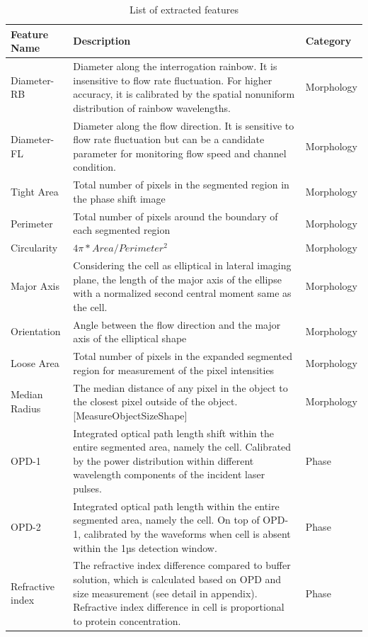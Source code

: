 \documentclass[aps,pra,preprint,superscriptaddress]{revtex4-1}
\begin{document}
\begin{table}[H]
\caption{\label{tbl:Features} List of extracted features}
\begin{tabular}{|p{}|p{}|p{}|}
\hline
Feature Name	 &Description	 &Category\\ \hline
Diameter-RB	 &Diameter along the interrogation rainbow. It is insensitive to flow rate fluctuation. For higher accuracy, it is calibrated by the spatial nonuniform distribution of rainbow wavelengths. 	 &Morphology\\ \hline
Diameter-FL	 &Diameter along the flow direction. It is sensitive to flow rate fluctuation but can be a candidate parameter for monitoring flow speed and channel condition.	 &Morphology\\ \hline
Tight Area	 &Total number of pixels in the segmented region in the phase shift image	 &Morphology\\ \hline
Perimeter	 &Total number of pixels around the boundary of each segmented region	 &Morphology\\ \hline
Circularity	 &${4π*Area/Perimeter^2}$  &Morphology\\ \hline
Major Axis 	 &Considering the cell as elliptical in lateral imaging plane, the length of the major axis of the ellipse with a normalized second central moment same as the cell.	 &Morphology\\ \hline
Orientation	 &Angle between the flow direction and the major axis of the elliptical shape	 &Morphology\\ \hline
Loose Area	 &Total number of pixels in the expanded segmented region for measurement of the pixel intensities	 &Morphology\\ \hline
Median Radius	 &The median distance of any pixel in the object to the closest pixel outside of the object. [MeasureObjectSizeShape]	 &Morphology\\ \hline
OPD-1	 &Integrated optical path length shift within the entire segmented area, namely the cell. Calibrated by the power distribution within different wavelength components of the incident laser pulses.	 &Phase\\ \hline
OPD-2	 &Integrated optical path length within the entire segmented area, namely the cell. On top of OPD-1, calibrated by the waveforms when cell is absent within the 1µs detection window.	 &Phase\\ \hline
Refractive index	 &The refractive index difference compared to buffer solution, which is calculated based on OPD and size measurement (see detail in appendix). Refractive index difference in cell is proportional to protein concentration.	 &Phase\\ \hline

\end{tabular}
\end{table}
\end{document}
